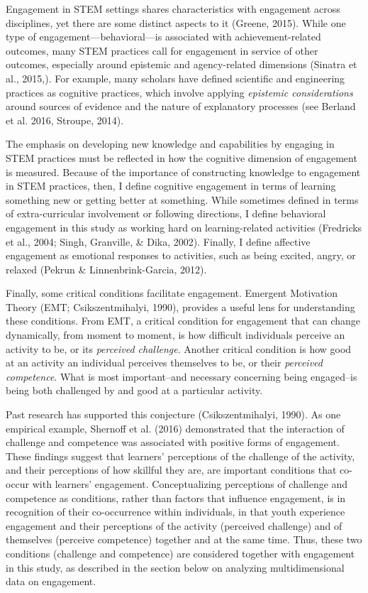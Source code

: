 \documentclass[]{book}
\theoremstyle{definition}
\theoremstyle{definition}
\theoremstyle{definition}
\theoremstyle{remark}
\begin{document}
Engagement in STEM settings shares characteristics with engagement
across disciplines, yet there are some distinct aspects to it (Greene,
2015). While one type of engagement---behavioral---is associated with
achievement-related outcomes, many STEM practices call for engagement in
service of other outcomes, especially around epistemic and
agency-related dimensions (Sinatra et al., 2015,). For example, many
scholars have defined scientific and engineering practices as cognitive
practices, which involve applying \emph{epistemic considerations} around
sources of evidence and the nature of explanatory processes (see Berland
et al. 2016, Stroupe, 2014).

The emphasis on developing new knowledge and capabilities by engaging in
STEM practices must be reflected in how the cognitive dimension of
engagement is measured. Because of the importance of constructing
knowledge to engagement in STEM practices, then, I define cognitive
engagement in terms of learning something new or getting better at
something. While sometimes defined in terms of extra-curricular
involvement or following directions, I define behavioral engagement in
this study as working hard on learning-related activities (Fredricks et
al., 2004; Singh, Granville, \& Dika, 2002). Finally, I define affective
engagement as emotional responses to activities, such as being excited,
angry, or relaxed (Pekrun \& Linnenbrink-Garcia, 2012).

Finally, some critical conditions facilitate engagement. Emergent
Motivation Theory (EMT; Csikszentmihalyi, 1990), provides a useful lens
for understanding these conditions. From EMT, a critical condition for
engagement that can change dynamically, from moment to moment, is how
difficult individuals perceive an activity to be, or its \emph{perceived
challenge}. Another critical condition is how good at an activity an
individual perceives themselves to be, or their \emph{perceived
competence}. What is most important--and necessary concerning being
engaged--is being both challenged by and good at a particular activity.

Past research has supported this conjecture (Csikszentmihalyi, 1990). As
one empirical example, Shernoff et al. (2016) demonstrated that the
interaction of challenge and competence was associated with positive
forms of engagement. These findings suggest that learners' perceptions
of the challenge of the activity, and their perceptions of how skillful
they are, are important conditions that co-occur with learners'
engagement. Conceptualizing perceptions of challenge and competence as
conditions, rather than factors that influence engagement, is in
recognition of their co-occurrence within individuals, in that youth
experience engagement and their perceptions of the activity (perceived
challenge) and of themselves (perceive competence) together and at the
same time. Thus, these two conditions (challenge and competence) are
considered together with engagement in this study, as described in the
section below on analyzing multidimensional data on engagement.
\end{document}
